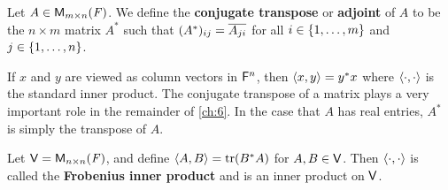 \begin{defn}\label{6.1.5}
  Let \(A \in \ms\).
  We define the \textbf{conjugate transpose} or \textbf{adjoint} of \(A\) to be the \(n \times m\) matrix \(A^*\) such that \((A^*)_{i j} = \overline{A_{j i}}\) for all \(i \in \left\lbrace1, \dots, m\right\rbrace\) and \(j \in \left\lbrace1, \dots, n\right\rbrace\).
\end{defn}

\begin{note}
  If \(x\) and \(y\) are viewed as column vectors in \(\mathsf{F}^n\), then \(\left\langle x, y\right\rangle = y^* x\) where \(\left\langle\cdot, \cdot\right\rangle\) is the standard inner product.
  The conjugate transpose of a matrix plays a very important role in the remainder of \cref{ch:6}.
  In the case that \(A\) has real entries, \(A^*\) is simply the transpose of \(A\).
\end{note}

\begin{eg}\label{6.1.6}
  Let \(\V = \ms[n][n][\F]\), and define \(\inn{A, B} = \tr(B^* A)\) for \(A, B \in \mathsf{V}\).
  Then \(\left\langle\cdot, \cdot\right\rangle\) is called the \textbf{Frobenius inner product} and is an inner product on \(\mathsf{V}\).
\end{eg}

